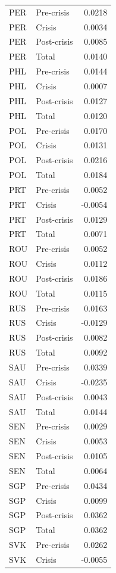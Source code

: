 \begin{longtable}[t]{llr}
PER & Pre-crisis & 0.0218\\
\addlinespace
PER & Crisis & 0.0034\\
PER & Post-crisis & 0.0085\\
PER & Total & 0.0140\\
PHL & Pre-crisis & 0.0144\\
PHL & Crisis & 0.0007\\
\addlinespace
PHL & Post-crisis & 0.0127\\
PHL & Total & 0.0120\\
POL & Pre-crisis & 0.0170\\
POL & Crisis & 0.0131\\
POL & Post-crisis & 0.0216\\
\addlinespace
POL & Total & 0.0184\\
PRT & Pre-crisis & 0.0052\\
PRT & Crisis & -0.0054\\
PRT & Post-crisis & 0.0129\\
PRT & Total & 0.0071\\
\addlinespace
ROU & Pre-crisis & 0.0052\\
ROU & Crisis & 0.0112\\
ROU & Post-crisis & 0.0186\\
ROU & Total & 0.0115\\
RUS & Pre-crisis & 0.0163\\
\addlinespace
RUS & Crisis & -0.0129\\
RUS & Post-crisis & 0.0082\\
RUS & Total & 0.0092\\
SAU & Pre-crisis & 0.0339\\
SAU & Crisis & -0.0235\\
\addlinespace
SAU & Post-crisis & 0.0043\\
SAU & Total & 0.0144\\
SEN & Pre-crisis & 0.0029\\
SEN & Crisis & 0.0053\\
SEN & Post-crisis & 0.0105\\
\addlinespace
SEN & Total & 0.0064\\
SGP & Pre-crisis & 0.0434\\
SGP & Crisis & 0.0099\\
SGP & Post-crisis & 0.0362\\
SGP & Total & 0.0362\\
\addlinespace
SVK & Pre-crisis & 0.0262\\
SVK & Crisis & -0.0055\\

\end{longtable}
